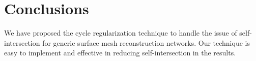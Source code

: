 \section{Conclusions}
We have proposed the cycle regularization technique to handle the issue of self-intersection for generic surface mesh reconstruction networks. Our technique is easy to implement and effective in reducing self-intersection in the results.